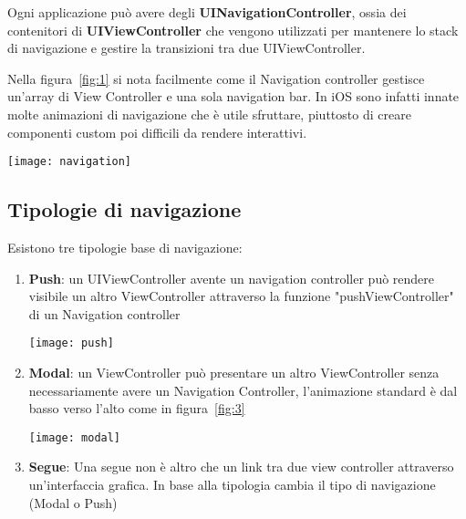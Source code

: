 Ogni applicazione può avere degli \textbf{UINavigationController}\cite{navigationcontroller},
ossia dei contenitori di \textbf{UIViewController}\cite{viewcontroller} che vengono
utilizzati per mantenere lo stack di navigazione e gestire la transizioni tra due UIViewController.

Nella figura~\ref{fig:1} si nota facilmente come il Navigation controller gestisce un'array di View Controller e una sola 
navigation bar. 
In iOS sono infatti innate molte animazioni di navigazione che è utile sfruttare, piuttosto di creare 
componenti custom poi difficili da rendere interattivi.\\

\begin{minipage}{\linewidth}
    \centering
    \texttt{[image: navigation]}
    \label{fig:1}
\end{minipage}

\subsection{Tipologie di navigazione}\label{sec:navigation}

Esistono tre tipologie base di navigazione:

\begin{enumerate}
    \item{\textbf{Push}: un UIViewController avente un navigation controller può rendere
    visibile un altro ViewController attraverso la funzione "pushViewController" di un Navigation controller\par
    \begin{minipage}{\linewidth}
        \centering
        \texttt{[image: push]}
        \label{fig:2}
    \end{minipage}
    }
    \item{ \textbf{Modal}: un ViewController può presentare un altro ViewController senza necessariamente avere un 
        Navigation Controller, l'animazione standard è dal basso verso l'alto come in figura~\ref{fig:3}\par
        \begin{minipage}{\linewidth}
            \centering
            \texttt{[image: modal]}
            \label{fig:3}
        \end{minipage}
    }
    \item{\textbf{Segue}: Una segue non è altro che un link tra due view controller attraverso un'interfaccia
        grafica. In base alla tipologia cambia il tipo di navigazione (Modal o Push)
    }
\end{enumerate}

